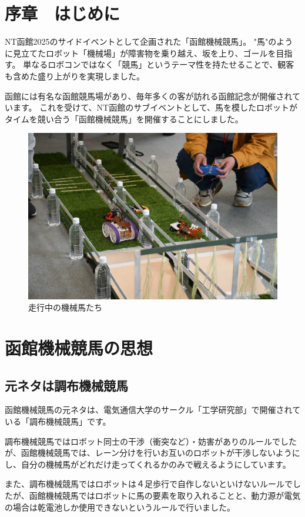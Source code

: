 \chapter{序章　はじめに}
NT函館2025のサイドイベントとして企画された「函館機械競馬」。  
"馬"のように見立てたロボット「機械場」が障害物を乗り越え、坂を上り、ゴールを目指す。  
単なるロボコンではなく「競馬」というテーマ性を持たせることで、観客も含めた盛り上がりを実現しました。

函館には有名な函館競馬場があり、毎年多くの客が訪れる函館記念が開催されています。  
これを受けて、NT函館のサブイベントとして、馬を模したロボットがタイムを競い合う「函館機械競馬」を開催することにしました。

\begin{figure}[h]
\centering
\includegraphics[width=0.7\linewidth]{pages/images/course.png}
\caption{走行中の機械馬たち}
\end{figure}

\chapter{函館機械競馬の思想}
\section{元ネタは調布機械競馬}
函館機械競馬の元ネタは、電気通信大学のサークル「工学研究部」で開催されている「調布機械競馬」です。

調布機械競馬ではロボット同士の干渉（衝突など）・妨害がありのルールでしたが、函館機械競馬では、レーン分けを行いお互いのロボットが干渉しないようにし、自分の機械馬がどれだけ走ってくれるかのみで戦えるようにしています。

また、調布機械競馬ではロボットは４足歩行で自作しないといけないルールでしたが、函館機械競馬ではロボットに馬の要素を取り入れることと、動力源が電気の場合は乾電池しか使用できないというルールで行いました。

